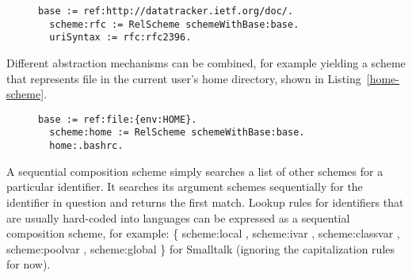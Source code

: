 \documentclass[preprint,authoryear]{acm_proc_article-sp}
\begin{document}

\begin{figure}[htbp]
\begin{lstlisting}[style=L,label=rfc-scheme,caption=Retrieving RFC 2396 (URI Syntax) via custom rfc: scheme.]
  base := ref:http://datatracker.ietf.org/doc/.
  scheme:rfc := RelScheme schemeWithBase:base.
  uriSyntax := rfc:rfc2396.
\end{lstlisting}
\end{figure}

Different abstraction mechanisms can be combined, for example yielding
a scheme that represents file in the current user's home directory, shown
in Listing~\ref{home-scheme}.


\begin{figure}[htbp]
\begin{lstlisting}[style=L,label=home-scheme,caption=Accessing .bashrc via custom home: scheme.]
  base := ref:file:{env:HOME}.
  scheme:home := RelScheme schemeWithBase:base.
  home:.bashrc.
\end{lstlisting}
\end{figure}

A sequential composition scheme simply searches a list of other schemes
for a particular identifier.  It searches its argument schemes sequentially
for the identifier in question and returns the first match.  Lookup rules for
identifiers that are usually hard-coded into languages can be expressed
as a sequential composition scheme, for example:   \{ scheme:local ,
scheme:ivar , scheme:classvar , scheme:poolvar , scheme:global \} for Smalltalk 
(ignoring the capitalization rules for now).
\end{document}
